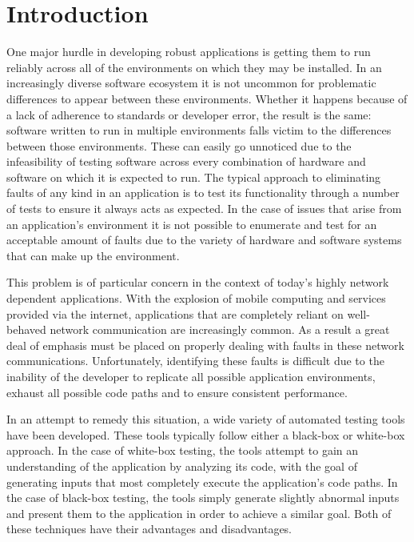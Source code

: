 \section{Introduction}

    One major hurdle in developing robust applications is getting them to run reliably across all of the environments on
    which they may be installed. In an increasingly diverse software ecosystem it is not uncommon for problematic
    differences to appear between these environments. Whether it happens because of a lack of adherence to standards or
    developer error, the result is the same: software written to run in multiple environments falls victim to the
    differences between those environments. These can easily go unnoticed due to the infeasibility of testing software
    across every combination of hardware and software on which it is expected to run.  The typical approach to
    eliminating faults of any kind in an application is to test its functionality through a number of tests to ensure it
    always acts as expected. In the case of issues that arise from an application's environment it is not possible to
    enumerate and test for an acceptable amount of faults due to the variety of hardware and software systems that can
    make up the environment.

    This problem is of particular concern in the context of today's highly network dependent applications. With the
    explosion of mobile computing and services provided via the internet, applications that are completely reliant on
    well-behaved network communication are increasingly common. As a result a great deal of emphasis must be placed on
    properly dealing with faults in these network communications. Unfortunately, identifying these faults is difficult
    due to the inability of the developer to replicate all possible application environments, exhaust all possible
    code paths and to ensure consistent performance.

    In an attempt to remedy this situation, a wide variety of automated testing tools have been developed. These tools
    typically follow either a black-box or white-box approach. In the case of white-box testing, the tools attempt to
    gain an understanding of the application by analyzing its code, with the goal of generating inputs that most
    completely execute the application's code paths. In the case of black-box testing, the tools simply generate
    slightly abnormal inputs and present them to the application in order to achieve a similar goal. Both of these
    techniques have their advantages and disadvantages.

